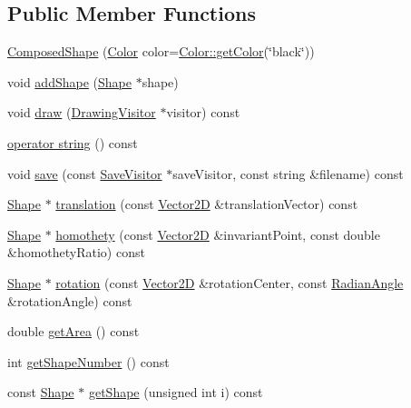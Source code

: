 \subsection*{Public Member Functions}
\begin{DoxyCompactItemize}
\item 
\hyperlink{class_composed_shape_a048c0d943a560bba5f5b4c9d9a18afc9}{Composed\+Shape} (\hyperlink{class_color}{Color} color=\hyperlink{class_color_a94697e8c9eb81124c5a7c1439e1e7348}{Color\+::get\+Color}(\char`\"{}black\char`\"{}))
\item 
void \hyperlink{class_composed_shape_a5f78e498ae77eeefc868d28ae8c8aa99}{add\+Shape} (\hyperlink{class_shape}{Shape} $\ast$shape)
\item 
void \hyperlink{class_composed_shape_a30f69734aa983bca56574ff4e5fd1723}{draw} (\hyperlink{class_drawing_visitor}{Drawing\+Visitor} $\ast$visitor) const
\item 
\hyperlink{class_composed_shape_aef491963b0e58209d1921973f2711c94}{operator string} () const
\item 
void \hyperlink{class_composed_shape_af189684eb5328b2fc13c694d7e637ff8}{save} (const \hyperlink{class_save_visitor}{Save\+Visitor} $\ast$save\+Visitor, const string \&filename) const
\item 
\hyperlink{class_shape}{Shape} $\ast$ \hyperlink{class_composed_shape_a31337a3fc33ac1fb929edbb6ff485dcc}{translation} (const \hyperlink{class_vector2_d}{Vector2D} \&translation\+Vector) const
\item 
\hyperlink{class_shape}{Shape} $\ast$ \hyperlink{class_composed_shape_acff645310f05924aaf66b0de71b2307a}{homothety} (const \hyperlink{class_vector2_d}{Vector2D} \&invariant\+Point, const double \&homothety\+Ratio) const
\item 
\hyperlink{class_shape}{Shape} $\ast$ \hyperlink{class_composed_shape_a9c4f0561d631b20c6cd56348d41a14dd}{rotation} (const \hyperlink{class_vector2_d}{Vector2D} \&rotation\+Center, const \hyperlink{class_radian_angle}{Radian\+Angle} \&rotation\+Angle) const
\item 
double \hyperlink{class_composed_shape_a89b3457e1699afeb86805afad627d2c7}{get\+Area} () const
\item 
int \hyperlink{class_composed_shape_ab33696ffeb5f3840cf0c5b75c8911787}{get\+Shape\+Number} () const
\item 
const \hyperlink{class_shape}{Shape} $\ast$ \hyperlink{class_composed_shape_a144d7d70317e5123f081d36689254ea8}{get\+Shape} (unsigned int i) const
\end{DoxyCompactItemize}
